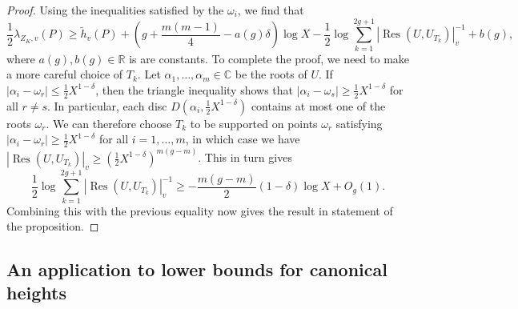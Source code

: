 \documentclass{article} %
\numberwithin{equation}{section}
\newcommand{\R}{\mathbb{R}}
\newcommand{\bC}{\mathbb{C}}
\begin{document}
\begin{proof}
Using the inequalities satisfied by the $\omega_i$, we find that
\[ \frac{1}{2} \lambda_{Z_K, v}(P) \geq \widetilde{h}_v(P) + (g + \frac{m(m-1)}{4} - a(g) \delta) \log X - \frac{1}{2} \log \sum_{k=1}^{2g+1} |\operatorname{Res}(U, U_{T_k})|^{-1}_v + b(g), \]
where $a(g), b(g) \in \R$ is are constants. To complete the proof, we need to make a more careful choice of $T_k$. Let $\alpha_1, \dots, \alpha_m \in \bC$ be the roots of $U$. If $|\alpha_i - \omega_r| \leq \frac{1}{2} X^{1-\delta}$, then the triangle inequality shows that $|\alpha_i - \omega_s| \geq \frac{1}{2} X^{1-\delta}$ for all $r \neq s$. In particular, each disc $D(\alpha_i, \frac{1}{2} X^{1-\delta})$ contains at most one of the roots $\omega_r$. We can therefore choose $T_k$ to be supported on points $\omega_r$ satisfying $|\alpha_i - \omega_r| \geq \frac{1}{2} X^{1-\delta}$ for all $i = 1, \dots, m$, in which case we have $| \operatorname{Res}(U, U_{T_k}) |_v \geq (\frac{1}{2} X^{1-\delta})^{m(g-m)}$. This in turn gives
\[ \frac{1}{2} \log \sum_{k=1}^{2g+1} |\operatorname{Res}(U, U_{T_k})|_v^{-1} \geq -\frac{m(g-m)}{2} (1-\delta) \log X  + O_g(1). \]
Combining this with the previous equality now gives the result in statement of the proposition. 
\end{proof}

\subsection{An application to lower bounds for canonical heights}
\end{document}
